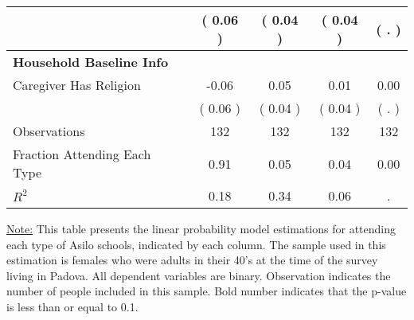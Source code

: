 \begin{table}[H]
{\begin{tabular}{lcccc}
\quad  & (     0.06 ) & (     0.04 )  & (     0.04 )  & (        . )  \\
\midrule
\textbf{Household Baseline Info} \\
\quad Caregiver Has Religion &     -0.06 &      0.05 &      0.01 &      0.00 \\
\quad  & (     0.06 ) & (     0.04 )  & (     0.04 )  & (        . )  \\
\midrule
Observations & 132 & 132 & 132 & 132 \\
Fraction Attending Each Type &      0.91 &      0.05 &      0.04 &      0.00 \\
\midrule
$ R^2$ &      0.18 &      0.34 &      0.06 &         . \\
\bottomrule
\end{tabular}}
\end{table}
\begin{footnotesize}
\noindent\underline{Note:} This table presents the linear probability model estimations for attending each type of Asilo schools, indicated by each column. The sample used in this estimation is females who were adults in their 40's at the time of the survey living in Padova. All dependent variables are binary. Observation indicates the number of people included in this sample. Bold number indicates that the p-value is less than or equal to 0.1.
\end{footnotesize}
